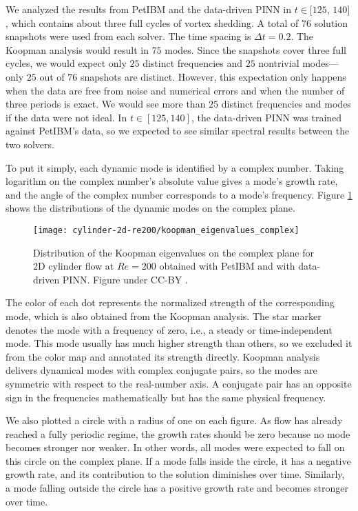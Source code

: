 We analyzed the results from PetIBM and the data-driven PINN in $t\in$$[125$, $140]$, which contains about three full cycles of vortex shedding.
A total of $76$ solution snapshots were used from each solver.
The time spacing is $\Delta t = 0.2$.
The Koopman analysis would result in $75$ modes.
Since the snapshots cover three full cycles, we would expect only $25$ distinct frequencies and $25$ nontrivial modes---only $25$ out of $76$ snapshots are distinct.
However, this expectation only happens when the data are free from noise and numerical errors and when the number of three periods is exact.
We would see more than $25$ distinct frequencies and modes if the data were not ideal.
In $t \in [125, 140]$, the data-driven PINN was trained against PetIBM's data, so we expected to see similar spectral results between the two solvers.

To put it simply, each dynamic mode is identified by a complex number.
Taking logarithm on the complex number's absolute value gives a mode's growth rate, and the angle of the complex number corresponds to a mode's frequency.
Figure \ref{fig:cylinder-re200-koopman-eig-dist} shows the distributions of the dynamic modes on the complex plane.
\begin{figure}
    \centering%
    \texttt{[image: cylinder-2d-re200/koopman\_eigenvalues\_complex]}%
    \caption{%
        Distribution of the Koopman eigenvalues on the complex plane for 2D cylinder flow at $Re=\num{200}$ obtained with PetIBM and with data-driven PINN. Figure under CC-BY \cite{chuang_barba_2023_fig19}.
    }
    \label{fig:cylinder-re200-koopman-eig-dist}%
\end{figure}
The color of each dot represents the normalized strength of the corresponding mode, which is also obtained from the Koopman analysis.
The star marker denotes the mode with a frequency of zero, i.e., a steady or time-independent mode.
This mode usually has much higher strength than others, so we excluded it from the color map and annotated its strength directly.
Koopman analysis delivers dynamical modes with complex conjugate pairs, so the modes are symmetric with respect to the real-number axis. 
A conjugate pair has an opposite sign in the frequencies mathematically but has the same physical frequency.

We also plotted a circle with a radius of one on each figure.
As flow has already reached a fully periodic regime, the growth rates should be zero because no mode becomes stronger nor weaker.
In other words, all modes were expected to fall on this circle on the complex plane.
If a mode falls inside the circle, it has a negative growth rate, and its contribution to the solution diminishes over time.
Similarly, a mode falling outside the circle has a positive growth rate and becomes stronger over time.

